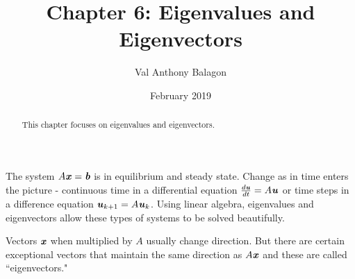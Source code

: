 \documentclass[12pt, letterpaper]{article}
\author{Val Anthony Balagon}
\date{February 2019}
\title{Chapter 6: Eigenvalues and Eigenvectors}
\newcommand{\V}[1]{\textbf{\textit{#1}}}
\theoremstyle{definition}
\begin{document}
	\maketitle
	\begin{abstract}
		This chapter focuses on eigenvalues and eigenvectors.
	\end{abstract}

The system $A\V{x} = \V{b}$ is in equilibrium and steady state. Change as in time enters the picture - continuous time in a differential equation $\frac{d\V{u}}{dt} = A\V{u}$ or time steps in a difference equation $\V{u}_{k+1} = A\V{u}_k$. Using linear algebra, eigenvalues and eigenvectors allow these types of systems to be solved beautifully.

Vectors $\V{x}$ when multiplied by $A$ usually change direction. But there are certain exceptional vectors that maintain the same direction as $A\V{x}$ and these are called ``eigenvectors."
\end{document}
